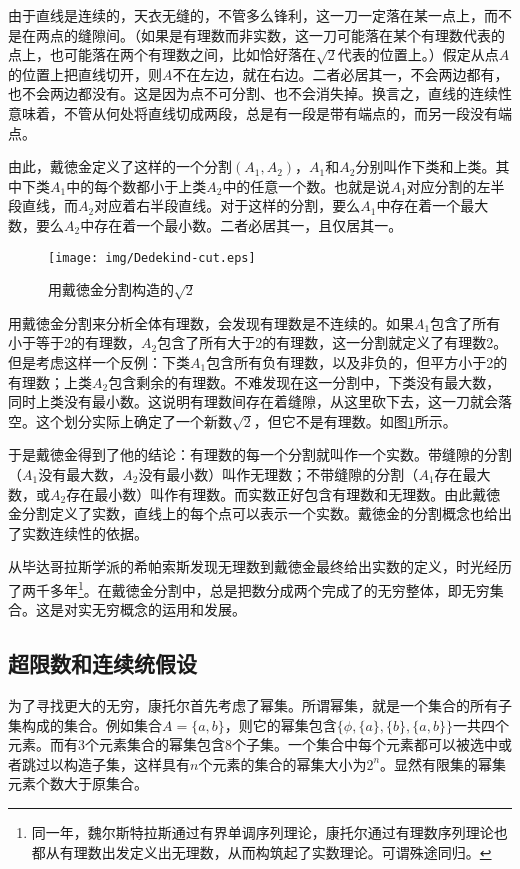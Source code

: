 \documentclass{article}
\begin{document}
由于直线是连续的，天衣无缝的，不管多么锋利，这一刀一定落在某一点上，而不是在两点的缝隙间。（如果是有理数而非实数，这一刀可能落在某个有理数代表的点上，也可能落在两个有理数之间，比如恰好落在$\sqrt{2}$代表的位置上。）假定从点$A$的位置上把直线切开，则$A$不在左边，就在右边。二者必居其一，不会两边都有，也不会两边都没有。这是因为点不可分割、也不会消失掉。换言之，直线的连续性意味着，不管从何处将直线切成两段，总是有一段是带有端点的，而另一段没有端点。

由此，戴徳金定义了这样的一个分割$(A_1, A_2)$，$A_1$和$A_2$分别叫作下类和上类。其中下类$A_1$中的每个数都小于上类$A_2$中的任意一个数。也就是说$A_1$对应分割的左半段直线，而$A_2$对应着右半段直线。对于这样的分割，要么$A_1$中存在着一个最大数，要么$A_2$中存在着一个最小数。二者必居其一，且仅居其一。

\begin{figure}[htbp]
 \centering
 \texttt{[image: img/Dedekind-cut.eps]}
 \caption{用戴徳金分割构造的$\sqrt{2}$}
 \label{fig:Dedekind-cut}
\end{figure}

用戴徳金分割来分析全体有理数，会发现有理数是不连续的。如果$A_1$包含了所有小于等于2的有理数，$A_2$包含了所有大于2的有理数，这一分割就定义了有理数2。但是考虑这样一个反例：下类$A_1$包含所有负有理数，以及非负的，但平方小于2的有理数；上类$A_2$包含剩余的有理数。不难发现在这一分割中，下类没有最大数，同时上类没有最小数。这说明有理数间存在着缝隙，从这里砍下去，这一刀就会落空。这个划分实际上确定了一个新数$\sqrt{2}$，但它不是有理数。如图\ref{fig:Dedekind-cut}所示。

于是戴徳金得到了他的结论：有理数的每一个分割就叫作一个实数。带缝隙的分割（$A_1$没有最大数，$A_2$没有最小数）叫作无理数；不带缝隙的分割（$A_1$存在最大数，或$A_2$存在最小数）叫作有理数。而实数正好包含有理数和无理数。由此戴徳金分割定义了实数，直线上的每个点可以表示一个实数。戴徳金的分割概念也给出了实数连续性的依据。

从毕达哥拉斯学派的希帕索斯发现无理数到戴徳金最终给出实数的定义，时光经历了两千多年\footnote{同一年，魏尔斯特拉斯通过有界单调序列理论，康托尔通过有理数序列理论也都从有理数出发定义出无理数，从而构筑起了实数理论。可谓殊途同归。}。在戴徳金分割中，总是把数分成两个完成了的无穷整体，即无穷集合。这是对实无穷概念的运用和发展。

\subsection{超限数和连续统假设}
为了寻找更大的无穷，康托尔首先考虑了幂集。所谓幂集，就是一个集合的所有子集构成的集合。例如集合$A = \{a, b\}$，则它的幂集包含$\{\phi, \{a\}, \{b\}, \{a, b\}\}$一共四个元素。而有3个元素集合的幂集包含8个子集。一个集合中每个元素都可以被选中或者跳过以构造子集，这样具有$n$个元素的集合的幂集大小为$2^n$。显然有限集的幂集元素个数大于原集合。
\end{document}
